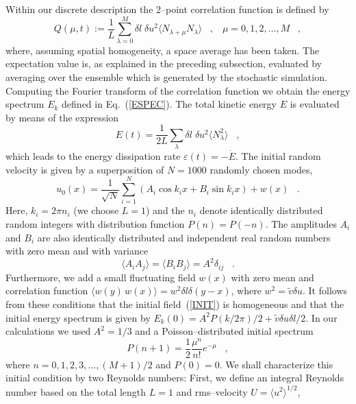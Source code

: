 Within our discrete description the 2--point correlation function
is defined by
\begin{equation}    \label{KORRFD}
Q(\mu,t) := \frac{1}{L} \sum_{\lambda =0}^{M} \delta l \; \delta u^2
\langle N_{\lambda + \mu} N_{\lambda} \rangle \;\;\; ,
\;\;\;
\mu = 0,1,2,\ldots,M \;\;\; ,
\end{equation}
where, assuming spatial homogeneity, a space average has been taken.
The
expectation value is, as explained in the preceding subsection,
evaluated
by averaging over the ensemble which is generated by the stochastic
simulation. Computing the Fourier transform of the correlation
function
we obtain the energy spectrum $E_{k}$ defined in Eq.~(\ref{ESPEC}).
The total
kinetic energy $E$ is evaluated by means of the expression
\begin{equation}
E(t) = \frac{1}{2L} \sum_{\lambda} \delta l \; \delta u^2
\langle N_{\lambda}^2 \rangle
\;\;\; ,
\end{equation}
which leads to the energy dissipation rate $\varepsilon(t)
= -\dot{E}$.
The initial random velocity
is given by a superposition of $N = 1000$ randomly chosen modes,
\begin{equation}     \label{INIT}
u_0(x) = \frac{1}{\sqrt{N}} \sum_{i=1}^{N} \left( A_i \cos k_i x +
B_i \sin k_i x  \right) + w(x) \;\;\; .
\end{equation}
Here, $k_i = 2\pi n_i$ (we choose $L=1$) and the $n_i$ denote
identically distributed random integers with distribution function
$P(n) = P(-n)$. The amplitudes $A_i$ and $B_i$ are also identically
distributed and independent real random numbers with zero mean
and with
variance
\[ \langle A_i A_j \rangle = \langle B_i B_j \rangle =
A^2 \delta_{ij}
\;\;\; .\]
Furthermore, we add a small fluctuating field $w(x)$ with
zero mean and
correlation function
$\langle w(y) \, w(x) \rangle = w^2 \delta l \delta (y-x)$, where
$w^2 = \tilde{v} \delta u$.
It follows from these conditions that the initial
field~(\ref{INIT}) is
homogeneous and that the initial energy spectrum is given by
$E_k(0) = A^2 P(k/2\pi)/2 + \tilde{v} \delta u \delta l /2$.
In our calculations we used
$A^2=1/3$ and a Poisson--distributed initial spectrum
\begin{equation}
P(n+1) = \frac{1}{2} \frac{\mu^{n}}{n !} e^{-\mu} \;\;\; ,
\end{equation}
where $n=0,1,2,3,\ldots ,(M+1)/2$ and $P(0) = 0$.
We shall characterize this initial condition by two Reynolds
numbers:
First, we define an integral Reynolds number based on the
total length $L=1$
and rms--velocity $U = \langle u^2 \rangle^{1/2}$,
